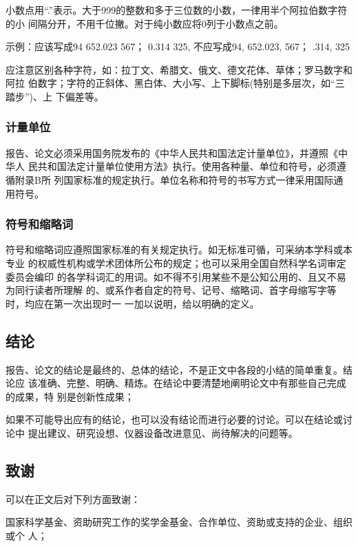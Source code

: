 \documentclass[oneside, phd]{njuthesis}
\begin{document}
小数点用“.”表示。大于999的整数和多于三位数的小数，一律用半个阿拉伯数字符的小
间隔分开，不用千位撇。对于纯小数应将0列于小数点之前。

示例：应该写成94 652.023 567；  0.314 325,  不应写成94, 652.023, 567；
   .314, 325

应注意区别各种字符，如：拉丁文、希腊文、俄文、德文花体、草体；罗马数字和阿拉
伯数字；字符的正斜体、黑白体、大小写、上下脚标(特别是多层次，如“三踏步”)、上
下偏差等。

\subsubsection{计量单位}

报告、论文必须采用国务院发布的《中华人民共和国法定计量单位》，并遵照《中华人
民共和国法定计量单位使用方法》执行。使用各种量、单位和符号，必须遵循附录B所
列国家标准的规定执行。单位名称和符号的书写方式一律采用国际通用符号。

\subsubsection{符号和缩略词}

符号和缩略词应遵照国家标准的有关规定执行。如无标准可循，可采纳本学科或本专业
的权威性机构或学术团体所公布的规定；也可以采用全国自然科学名词审定委员会编印
的各学科词汇的用词。如不得不引用某些不是公知公用的、且又不易为同行读者所理解
的、或系作者自定的符号、记号、缩略词、首字母缩写字等时，均应在第一次出现时一
一加以说明，给以明确的定义。

\subsection{结论}

报告、论文的结论是最终的、总体的结论，不是正文中各段的小结的简单重复。结论应
该准确、完整、明确、精炼。在结论中要清楚地阐明论文中有那些自己完成的成果，特
别是创新性成果；

如果不可能导出应有的结论，也可以没有结论而进行必要的讨论。可以在结论或讨论中
提出建议、研究设想、仪器设备改进意见、尚待解决的问题等。

\subsection{致谢}

可以在正文后对下列方面致谢：

国家科学基金、资助研究工作的奖学金基金、合作单位、资助或支持的企业、组织或个
人；
\end{document}
